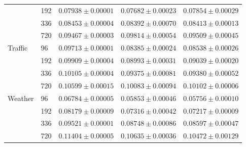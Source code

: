 \begin{table}[t]
\begin{tabular}{@{}llrrr@{}}
 & 192 & $0.07938\pm0.00001$ & \boldmath $0.07682\pm0.00023$ & $0.07854\pm0.00029$ \\
 & 336 & $0.08453\pm0.00004$ & \boldmath $0.08392\pm0.00070$ & $0.08413\pm0.00013$ \\
 & 720 & \boldmath $0.09467\pm0.00003$ & $0.09814\pm0.00054$ & $0.09509\pm0.00045$ \\
\midrule
Traffic & 96 & $0.09713\pm0.00001$ & \boldmath $0.08385\pm0.00024$ & $0.08538\pm0.00026$ \\
 & 192 & $0.09909\pm0.00004$ & \boldmath $0.08993\pm0.00031$ & $0.09039\pm0.00020$ \\
 & 336 & $0.10105\pm0.00004$ & \boldmath $0.09375\pm0.00081$ & $0.09380\pm0.00052$ \\
 & 720 & $0.10599\pm0.00015$ & \boldmath $0.10083\pm0.00094$ & $0.10102\pm0.00006$ \\
\midrule
Weather & 96 & $0.06784\pm0.00005$ & $0.05853\pm0.00046$ & \boldmath $0.05756\pm0.00010$ \\
 & 192 & $0.08179\pm0.00009$ & $0.07316\pm0.00042$ & \boldmath $0.07217\pm0.00009$ \\
 & 336 & $0.09521\pm0.00001$ & $0.08748\pm0.00086$ & \boldmath $0.08597\pm0.00047$ \\
 & 720 & $0.11404\pm0.00005$ & $0.10635\pm0.00036$ & \boldmath $0.10472\pm0.00129$ \\
\bottomrule
\end{tabular}
\end{table}
